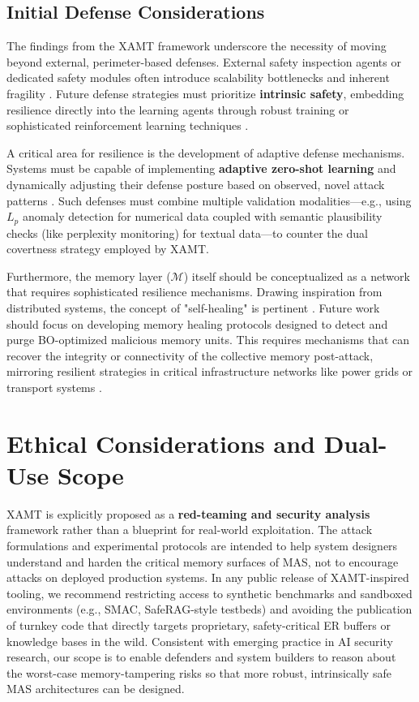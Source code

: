 \documentclass[conference]{IEEEtran}
\begin{document}
\subsection{Initial Defense Considerations}
The findings from the XAMT framework underscore the necessity of moving beyond external, perimeter-based defenses. External safety inspection agents or dedicated safety modules often introduce scalability bottlenecks and inherent fragility \cite{Ref46}. Future defense strategies must prioritize \textbf{intrinsic safety}, embedding resilience directly into the learning agents through robust training or sophisticated reinforcement learning techniques \cite{Ref46, Ref53}.

A critical area for resilience is the development of adaptive defense mechanisms. Systems must be capable of implementing \textbf{adaptive zero-shot learning} and dynamically adjusting their defense posture based on observed, novel attack patterns \cite{Ref5, Ref53}. Such defenses must combine multiple validation modalities—e.g., using $L_p$ anomaly detection for numerical data coupled with semantic plausibility checks (like perplexity monitoring) for textual data—to counter the dual covertness strategy employed by XAMT.

Furthermore, the memory layer ($\mathcal{M}$) itself should be conceptualized as a network that requires sophisticated resilience mechanisms. Drawing inspiration from distributed systems, the concept of "self-healing" is pertinent \cite{Ref54, Ref55}. Future work should focus on developing memory healing protocols designed to detect and purge BO-optimized malicious memory units. This requires mechanisms that can recover the integrity or connectivity of the collective memory post-attack, mirroring resilient strategies in critical infrastructure networks like power grids or transport systems \cite{Ref55}.

\section{Ethical Considerations and Dual-Use Scope}
XAMT is explicitly proposed as a \textbf{red-teaming and security analysis} framework rather than a blueprint for real-world exploitation. The attack formulations and experimental protocols are intended to help system designers understand and harden the critical memory surfaces of MAS, not to encourage attacks on deployed production systems. In any public release of XAMT-inspired tooling, we recommend restricting access to synthetic benchmarks and sandboxed environments (e.g., SMAC, SafeRAG-style testbeds) and avoiding the publication of turnkey code that directly targets proprietary, safety-critical ER buffers or knowledge bases in the wild. Consistent with emerging practice in AI security research, our scope is to enable defenders and system builders to reason about the worst-case memory-tampering risks so that more robust, intrinsically safe MAS architectures can be designed.
\end{document}
